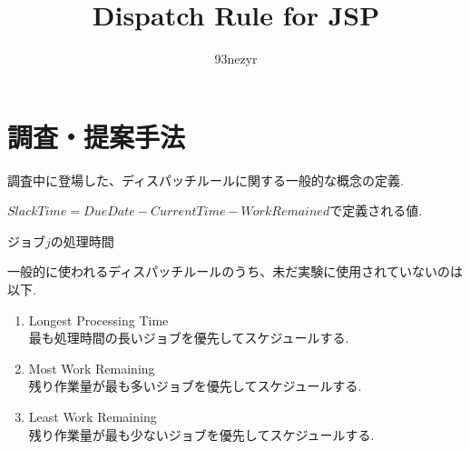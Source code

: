 \documentclass{ltjsarticle}
\begin{document}
\title{Dispatch Rule for JSP}
\author{93nezyr}
\maketitle

\section{調査・提案手法}

調査中に登場した、ディスパッチルールに関する一般的な概念の定義.

\begin{description}[style=multiline, leftmargin=10em]
  \item[$SlackTime$] $SlackTime = DueDate - CurrentTime - WorkRemained$で定義される値.
  \item[$P_j$] ジョブ$j$の処理時間
\end{description}

一般的に使われるディスパッチルールのうち、未だ実験に使用されていないのは以下.

\begin{enumerate}
  \item Longest Processing Time \\
        最も処理時間の長いジョブを優先してスケジュールする.
  \item Most Work Remaining \\
        残り作業量が最も多いジョブを優先してスケジュールする.
  \item Least Work Remaining \\
        残り作業量が最も少ないジョブを優先してスケジュールする.
\end{enumerate}
\end{document}
